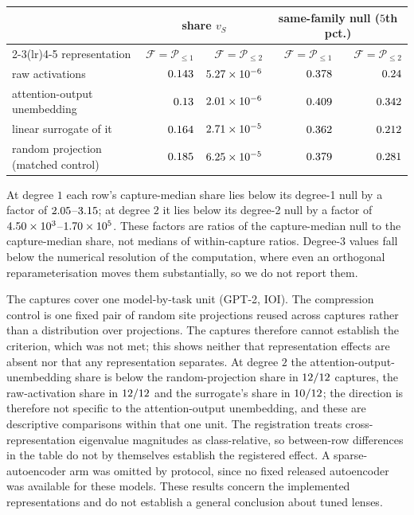 \begin{center}\small
\begin{tabular}{lrrrr}
\toprule
 & \multicolumn{2}{c}{share $v_S$} & \multicolumn{2}{c}{same-family null ($5$th pct.)} \\
\cmidrule(lr){2-3}\cmidrule(lr){4-5}
representation & $\mathcal F=\mathcal P_{\le1}$ & $\mathcal F=\mathcal P_{\le2}$ & $\mathcal F=\mathcal P_{\le1}$ & $\mathcal F=\mathcal P_{\le2}$ \\
\midrule
raw activations & $0.143$ & $5.27\times10^{-6}$ & $0.378$ & $0.24$ \\
attention-output unembedding & $0.13$  & $2.01\times10^{-6}$  & $0.409$ & $0.342$ \\
linear surrogate of it & $0.164$  & $2.71\times10^{-5}$  & $0.362$ & $0.212$ \\
\midrule
random projection (matched control) & $0.185$ & $6.25\times10^{-5}$ & $0.379$ & $0.281$ \\
\bottomrule
\end{tabular}
\end{center}

\noindent At degree $1$ each row's capture-median share lies below its degree-1 null by a factor of
$2.05$--$3.15$; at degree $2$ it lies below its degree-2 null by a factor of
$4.50\times10^{3}$--$1.70\times10^{5}$. These factors are ratios of the capture-median null to the capture-median
share, not medians of within-capture ratios. Degree-3 values fall below the numerical resolution of the computation,
where even an orthogonal reparameterisation moves them substantially, so we do not report them.

The captures cover one model-by-task unit (GPT-2, IOI). The compression control is one fixed pair of random site projections reused across
captures rather than a distribution over projections. The captures therefore cannot establish the criterion, which
was not met; this shows neither that representation effects are absent nor that any representation separates. At degree $2$
the attention-output-unembedding share is below the random-projection share in $12/12$ captures, the raw-activation share in
$12/12$ and the surrogate's share in $10/12$; the direction is therefore not specific to the
attention-output unembedding, and these are descriptive comparisons within that one unit. The registration treats cross-representation
eigenvalue magnitudes as class-relative, so between-row differences in the table do not by themselves establish the
registered effect. A sparse-autoencoder arm was omitted by protocol, since no fixed released autoencoder was available
for these models. These results concern the implemented representations and do not establish a general conclusion
about tuned lenses.

